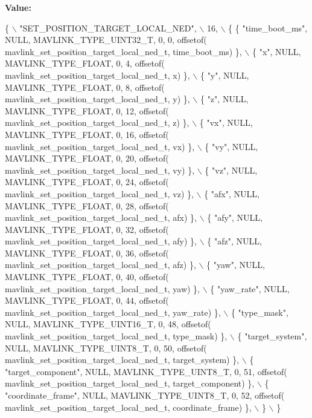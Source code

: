 {\bfseries Value\+:}
\begin{DoxyCode}
\{ \(\backslash\)
    \textcolor{stringliteral}{"SET\_POSITION\_TARGET\_LOCAL\_NED"}, \(\backslash\)
    16, \(\backslash\)
    \{  \{ \textcolor{stringliteral}{"time\_boot\_ms"}, NULL, MAVLINK_TYPE_UINT32_T, 0, 0, offsetof(
      mavlink_set_position_target_local_ned_t, time\_boot\_ms) \}, \(\backslash\)
         \{ \textcolor{stringliteral}{"x"}, NULL, MAVLINK_TYPE_FLOAT, 0, 4, offsetof(
      mavlink_set_position_target_local_ned_t, x) \}, \(\backslash\)
         \{ \textcolor{stringliteral}{"y"}, NULL, MAVLINK_TYPE_FLOAT, 0, 8, offsetof(
      mavlink_set_position_target_local_ned_t, y) \}, \(\backslash\)
         \{ \textcolor{stringliteral}{"z"}, NULL, MAVLINK_TYPE_FLOAT, 0, 12, offsetof(
      mavlink_set_position_target_local_ned_t, z) \}, \(\backslash\)
         \{ \textcolor{stringliteral}{"vx"}, NULL, MAVLINK_TYPE_FLOAT, 0, 16, offsetof(
      mavlink_set_position_target_local_ned_t, vx) \}, \(\backslash\)
         \{ \textcolor{stringliteral}{"vy"}, NULL, MAVLINK_TYPE_FLOAT, 0, 20, offsetof(
      mavlink_set_position_target_local_ned_t, vy) \}, \(\backslash\)
         \{ \textcolor{stringliteral}{"vz"}, NULL, MAVLINK_TYPE_FLOAT, 0, 24, offsetof(
      mavlink_set_position_target_local_ned_t, vz) \}, \(\backslash\)
         \{ \textcolor{stringliteral}{"afx"}, NULL, MAVLINK_TYPE_FLOAT, 0, 28, offsetof(
      mavlink_set_position_target_local_ned_t, afx) \}, \(\backslash\)
         \{ \textcolor{stringliteral}{"afy"}, NULL, MAVLINK_TYPE_FLOAT, 0, 32, offsetof(
      mavlink_set_position_target_local_ned_t, afy) \}, \(\backslash\)
         \{ \textcolor{stringliteral}{"afz"}, NULL, MAVLINK_TYPE_FLOAT, 0, 36, offsetof(
      mavlink_set_position_target_local_ned_t, afz) \}, \(\backslash\)
         \{ \textcolor{stringliteral}{"yaw"}, NULL, MAVLINK_TYPE_FLOAT, 0, 40, offsetof(
      mavlink_set_position_target_local_ned_t, yaw) \}, \(\backslash\)
         \{ \textcolor{stringliteral}{"yaw\_rate"}, NULL, MAVLINK_TYPE_FLOAT, 0, 44, offsetof(
      mavlink_set_position_target_local_ned_t, yaw\_rate) \}, \(\backslash\)
         \{ \textcolor{stringliteral}{"type\_mask"}, NULL, MAVLINK_TYPE_UINT16_T, 0, 48, offsetof(
      mavlink_set_position_target_local_ned_t, type\_mask) \}, \(\backslash\)
         \{ \textcolor{stringliteral}{"target\_system"}, NULL, MAVLINK_TYPE_UINT8_T, 0, 50, offsetof(
      mavlink_set_position_target_local_ned_t, target\_system) \}, \(\backslash\)
         \{ \textcolor{stringliteral}{"target\_component"}, NULL, MAVLINK_TYPE_UINT8_T, 0, 51, offsetof(
      mavlink_set_position_target_local_ned_t, target\_component) \}, \(\backslash\)
         \{ \textcolor{stringliteral}{"coordinate\_frame"}, NULL, MAVLINK_TYPE_UINT8_T, 0, 52, offsetof(
      mavlink_set_position_target_local_ned_t, coordinate\_frame) \}, \(\backslash\)
         \} \(\backslash\)
\}
\end{DoxyCode}
